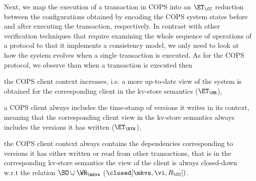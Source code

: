 Next, we map  the execution of a transaction in COPS into an $\ET_{\CC}$ reduction between the configurations 
obtained by encoding the COPS system states before and after executing the transaction, respectively.
In contrast with other verification techniques \cite{framework-concur,seebelieve} that require examining the whole sequence of operations 
of a protocol to that it implements a consistency model, we only need to look at how the system evolves 
when a single transaction is executed. As for the COPS protocol, we observe 
than when a transaction is executed then 
\begin{enumerate*} 
\item the COPS client context increases, i.e. a more up-to-date view of the system is obtained for the corresponding client in the 
kv-store semantics ($\ET_{\MR}$), 
\item a COPS client always includes the time-stamp of versions it writes in its context, meaning that the 
corresponding client view in the kv-store semantics always includes the versions it has written ($\ET_{\RYW}$), 
\item the COPS client context always contains the dependencies corresponding to versions it has 
either written or read from other transactions, that is in the corresponding kv-store semantics the view of the client is always closed-down 
w.r.t the relation $\SO \cup \WR_{\mkvs}$ ($\closed[\mkvs, \vi, R_{\CC}])$.
\end{enumerate*}


